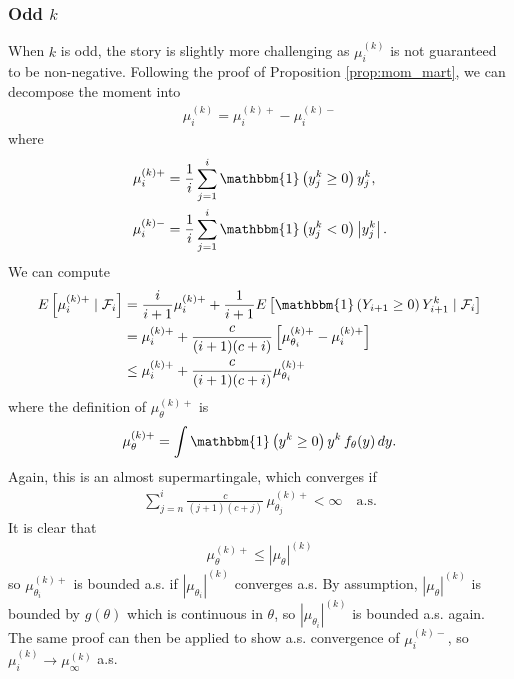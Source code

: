 \documentclass[11pt,a4paper]{article}
\theoremstyle{plain}
\theoremstyle{remark}
\theoremstyle{remark}
\begin{document}
\subsubsection{Odd $k$}
When $k$ is odd, the story is slightly more challenging as $\mu_i^{(k)}$ is not guaranteed to be non-negative. Following the proof of Proposition \ref{prop:mom_mart}, we can decompose the moment into
\begin{align*}
    \mu_i^{(k)} = \mu_i^{(k)+} - \mu_i^{(k)-}
\end{align*}
where
\begin{align*}
    \mu_i^{(k)+} &= \frac{1}{i}\sum_{j = 1}^i \mathbbm{1}\left(y_j^k \geq 0\right) y_j^k, \\
    \mu_i^{(k)-} &= \frac{1}{i}\sum_{j = 1}^i \mathbbm{1}\left(y_j^k < 0\right) \left|y_j^k\right|.
\end{align*}
We can compute
\begin{align*}
    E\left[\mu_i^{(k)+} \mid \mathcal{F}_i\right] &= \frac{i}{i+1} \mu_{i}^{(k)+} + \frac{1}{i+1}E\left[\mathbbm{1}\left(Y_{i+1} \geq 0\right) Y_{i+1}^k \mid \mathcal{F}_i\right]\\
    &=   \mu_i^{(k)+} + \frac{c}{(i+1)(c+i)}\left[\mu_{\theta_{i}}^{(k)+} - \mu_i^{(k)+}\right]\\
    &\leq    \mu_i^{(k)+} + \frac{c}{(i+1)(c+i)}\mu_{\theta_{i}}^{(k)+}
\end{align*}
where the definition of $\mu_{\theta}^{(k)+}$ is
\begin{align*}
    \mu_{\theta}^{(k)+} = \int \mathbbm{1}\left(y^k \geq 0\right)y^k\,  f_{\theta}(y) \, dy.
\end{align*}
Again, this is an almost supermartingale, which converges if
\begin{align*}
    \sum_{j = n}^i \frac{c}{(j+1)(c+j)}\, \mu_{\theta_j}^{(k)+} < \infty \quad \text {a.s.}
\end{align*}
It is clear that
\begin{align*}
    \mu_{\theta}^{(k)+} \leq \left|\mu_{\theta}\right|^{(k)}
\end{align*}
so $\mu_{\theta_i}^{(k)+}$ is bounded a.s. if $\left|\mu_{\theta_i}\right|^{(k)}$ converges a.s. 
By assumption, $|\mu_{\theta}|^{(k)}$ is bounded by $g(\theta)$ which is continuous in $\theta$, so $\left|\mu_{\theta_i}\right|^{(k)}$ is bounded a.s. again. The same proof can then be applied to show a.s. convergence of $\mu_{i}^{(k)-}$, so $\mu_i^{(k)} \to \mu_{\infty}^{(k)}$ a.s.
\end{document}
